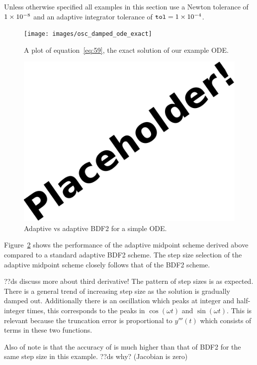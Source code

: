 Unless otherwise specified all examples in this section use a Newton tolerance of $1\times 10^{-8}$ and an adaptive integrator tolerance of ${\textrm{\textup{\texttt{tol}}}} = 1\times 10^{-4}$.

\begin{figure}[ht!]
  \centering
  \texttt{[image: images/osc\_damped\_ode\_exact]}
  \caption{A plot of equation~\eqref{eq:59}, the exact solution of our example ODE.}
  \label{fig:mp-ode-exact}
\end{figure}

\begin{figure}[ht!]
  \centering
  \includegraphics{images/placeholder}
  \caption{Adaptive \imr vs adaptive BDF2 for a simple ODE.}
  \label{fig:mp-vs-bdf2}
\end{figure}

Figure~\ref{fig:mp-vs-bdf2} shows the performance of the adaptive midpoint scheme derived above compared to a standard adaptive BDF2 scheme.\cite{Gresho-Sani} %
The step size selection of the adaptive midpoint scheme closely follows that of the BDF2 scheme.


??ds discuss more about third derivative!
The pattern of step sizes is as expected.
There is a general trend of increasing step size as the solution is gradually damped out.
Additionally there is an oscillation which peaks at integer and half-integer times, this corresponds to the peaks in $\cos(\omega t)$ and $\sin(\omega t)$.
This is relevant because the truncation error is proportional to $y'''(t)$ which consists of terms in these two functions.

Also of note is that the accuracy of \imr is much higher than that of BDF2 for the same step size in this example.
??ds why? (Jacobian is zero)


